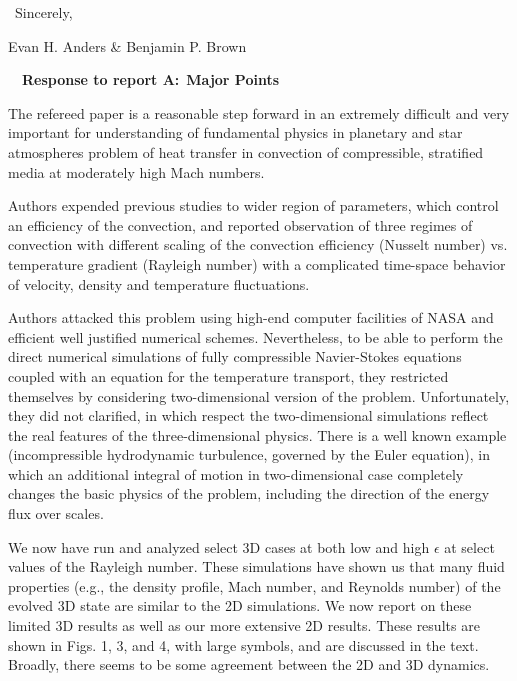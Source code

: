 \documentclass[aps, 11pt, singlecolumn]{revtex4-1} %
\begin{document}
\begin{singlespace}
$\,$\newline
\noindent
Sincerely,

Evan H. Anders \& Benjamin P. Brown




$\,$
\newline
$\,$
\newline
\noindent
\Large{\textbf{Response to report A:}}\newline$\,$\newline\indent
\large{\textbf{Major Points}}

\begin{myquotation}
The refereed paper is a reasonable step forward in an extremely
difficult and very important for understanding of fundamental physics
in planetary and star atmospheres problem of heat transfer in
convection of compressible, stratified media at moderately high Mach
numbers.

Authors expended previous studies to wider region of parameters, which
control an efficiency of the convection, and reported observation of
three regimes of convection with different scaling of the convection
efficiency (Nusselt number) vs. temperature gradient (Rayleigh number)
with a complicated time-space behavior of velocity, density and
temperature fluctuations.

Authors attacked this problem using high-end computer facilities of
NASA and efficient well justified numerical schemes. Nevertheless, to
be able to perform the direct numerical simulations of fully
compressible Navier-Stokes equations coupled with an equation for the
temperature transport, they restricted themselves by considering
two-dimensional version of the problem. Unfortunately, they did not
clarified, in which respect the two-dimensional simulations reflect
the real features of the three-dimensional physics. There is a well
known example (incompressible hydrodynamic turbulence, governed by the
Euler equation), in which an additional integral of motion in
two-dimensional case completely changes the basic physics of the
problem, including the direction of the energy flux over scales.
\end{myquotation}

We now have run and analyzed select 3D cases at both low and high $\epsilon$
at select values of the Rayleigh number.  These simulations have shown
us that many fluid properties (e.g., the density profile, Mach number, and Reynolds number)
of the evolved 3D state are similar to the 2D simulations.  We now report on these
limited 3D results as well as our more extensive 2D results. These results are shown
in Figs. 1, 3, and 4, with large symbols, and are discussed in the text.
Broadly, there seems to be some agreement between the 2D and 3D dynamics.


\end{singlespace}
\end{document}
